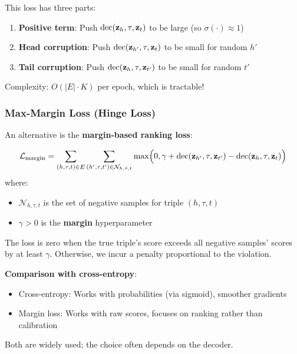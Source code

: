 \begin{notechapter}
\begin{intuition}
This loss has three parts:
\begin{enumerate}
    \item \textbf{Positive term}: Push $\text{dec}(\mathbf{z}_h, \tau, \mathbf{z}_t)$ to be large (so $\sigma(\cdot) \approx 1$)
    \item \textbf{Head corruption}: Push $\text{dec}(\mathbf{z}_{h'}, \tau, \mathbf{z}_t)$ to be small for random $h'$
    \item \textbf{Tail corruption}: Push $\text{dec}(\mathbf{z}_h, \tau, \mathbf{z}_{t'})$ to be small for random $t'$
\end{enumerate}
Complexity: $O(|E| \cdot K)$ per epoch, which is tractable!
\end{intuition}

\subsubsection*{Max-Margin Loss (Hinge Loss)}

An alternative is the \textbf{margin-based ranking loss}:

\begin{definition}
\begin{equation}
\mathcal{L}_{\text{margin}} = \sum_{(h,\tau,t) \in E} \sum_{(h',\tau,t') \in \mathcal{N}_{h,\tau,t}} \max\Bigl(0, \gamma + \text{dec}(\mathbf{z}_{h'}, \tau, \mathbf{z}_{t'}) - \text{dec}(\mathbf{z}_h, \tau, \mathbf{z}_t)\Bigr)
\end{equation}
where:
\begin{itemize}
    \item $\mathcal{N}_{h,\tau,t}$ is the set of negative samples for triple $(h, \tau, t)$
    \item $\gamma > 0$ is the \textbf{margin} hyperparameter
\end{itemize}
\end{definition}

\begin{intuition}
The loss is zero when the true triple's score exceeds all negative samples' scores by at least $\gamma$. Otherwise, we incur a penalty proportional to the violation.

\textbf{Comparison with cross-entropy}:
\begin{itemize}
    \item Cross-entropy: Works with probabilities (via sigmoid), smoother gradients
    \item Margin loss: Works with raw scores, focuses on ranking rather than calibration
\end{itemize}
Both are widely used; the choice often depends on the decoder.
\end{intuition}


\end{notechapter}

